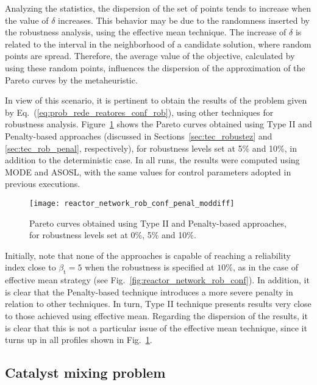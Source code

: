 \documentclass[final,5p,times,twocolumn,numbers]{elsarticle}
\begin{document}
Analyzing the statistics, the dispersion of the set of points tends to increase when the value of $ \delta $ increases. This behavior may be due to the randomness inserted by the robustness analysis, using the effective mean technique. The increase of $ \delta $ is related to the interval in the neighborhood of a candidate solution, where random points are spread. Therefore, the average value of the objective, calculated by using these random points, influences the dispersion of the approximation of the Pareto curves by the metaheuristic.

In view of this scenario, it is pertinent to obtain the results of the problem given by Eq.~(\ref{eq:prob_rede_reatores_conf_rob}), using other techniques for robustness analysis. Figure~\ref{fig:reactor_network_rob_conf_penal_moddiff} shows the Pareto curves obtained using Type II and Penalty-based approaches (discussed in Sections~\ref{sec:tec_robustez} and \ref{sec:tec_rob_penal}, respectively), for robustness levels set at 5\% and 10\%, in addition to the deterministic case. In all runs, the results were computed using MODE and ASOSL, with the same values for control parameters adopted in previous executions.

\begin{figure}[!ht]
    \centering
    \texttt{[image: reactor\_network\_rob\_conf\_penal\_moddiff]}
    \caption{Pareto curves obtained using Type II and Penalty-based approaches, for robustness levels set at 0\%, 5\% and 10\%.}
    \label{fig:reactor_network_rob_conf_penal_moddiff}
\end{figure}

Initially, note that none of the approaches is capable of reaching a reliability index close to $ \beta_{\mathrm{t}} = 5 $ when the robustness is specified at $ 10 \% $, as in the case of effective mean strategy (see Fig.~\ref{fig:reactor_network_rob_conf}). In addition, it is clear that the Penalty-based technique introduces a more severe penalty in relation to other techniques. In turn, Type II technique presents results very close to those achieved using effective mean. Regarding the dispersion of the results, it is clear that this is not a particular issue of the effective mean technique, since it turns up in all profiles shown in Fig.~\ref{fig:reactor_network_rob_conf_penal_moddiff}.

\subsection{Catalyst mixing problem}
\end{document}
